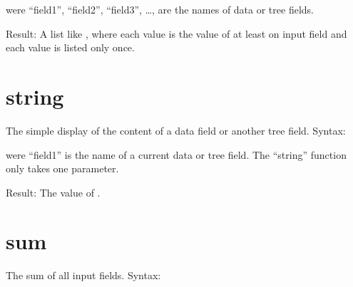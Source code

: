 \documentclass[letterpaper,10pt,english]{sphinxmanual}
\begin{document}
\sphinxAtStartPar
were “field1”, “field2”, “field3”, …, are the names of data or tree fields.

\sphinxAtStartPar
Result: A list like , where each value is the value of at least on input field and each value is listed only once.


\section{string}
\label{\detokenize{tree-fields:string}}
\sphinxAtStartPar
The simple display of the content of a data field or another tree field.
Syntax:

\begin{sphinxVerbatim}[commandchars=\\\{\}]
 
     
     \PYG{p}{[}\PYG{p}{]}
     \PYG{p}{[}\PYG{p}{]}
     \PYG{p}{[}\PYG{p}{]}
     \PYG{p}{[}\PYG{p}{]}
\end{sphinxVerbatim}

\sphinxAtStartPar
were “field1” is the name of a current data or tree field. The “string” function only takes one parameter.

\sphinxAtStartPar
Result: The value of .


\section{sum}
\label{\detokenize{tree-fields:sum}}
\sphinxAtStartPar
The sum of all input fields.
Syntax:

\begin{sphinxVerbatim}[commandchars=\\\{\}]
 
     
     \PYG{p}{[}  \PYG{p}{]}
     \PYG{p}{[} \PYG{p}{]}
     \PYG{p}{[}\PYG{p}{]}
     \PYG{p}{[}\PYG{p}{]}
\end{sphinxVerbatim}
\end{document}
